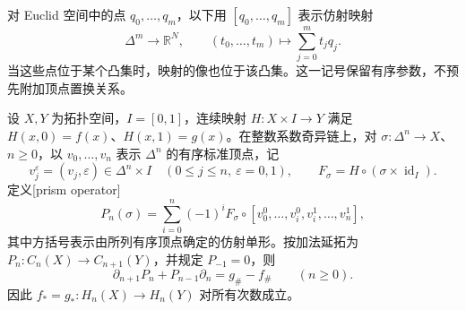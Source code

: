 对 Euclid 空间中的点 \(q_0,\ldots,q_m\)，以下用 \([q_0,\ldots,q_m]\) 表示仿射映射
\[
	\Delta^m\longrightarrow\mathbb R^N,\qquad
	(t_0,\ldots,t_m)\longmapsto\sum_{j=0}^m t_jq_j.
\]
当这些点位于某个凸集时，映射的像也位于该凸集。这一记号保留有序参数，不预先附加顶点置换关系。

\begin{theorem}\label{g2:thm:singular-homotopy-invariance}
	设 \(X,Y\) 为拓扑空间，\(I=[0,1]\)，连续映射 \(H:X\times I\to Y\) 满足 \(H(x,0)=f(x)\)、\(H(x,1)=g(x)\)。在整数系数奇异链上，对 \(\sigma:\Delta^n\to X\)、\(n\ge0\)，以 \(v_0,\ldots,v_n\) 表示 \(\Delta^n\) 的有序标准顶点，记
	\[
		v_j^\varepsilon=(v_j,\varepsilon)\in\Delta^n\times I
		\quad(0\le j\le n,\ \varepsilon=0,1),\qquad
		F_\sigma=H\circ(\sigma\times\operatorname{id}_I).
	\]
	定义[prism operator]
	\[
		P_n(\sigma)=\sum_{i=0}^n(-1)^i
		F_\sigma\circ
		[v_0^0,\ldots,v_i^0,v_i^1,\ldots,v_n^1],
	\]
	其中方括号表示由所列有序顶点确定的仿射单形。按加法延拓为 \(P_n:C_n(X)\to C_{n+1}(Y)\)，并规定 \(P_{-1}=0\)，则
	\begin{equation}\label{g2:eq:prism-identity}
		\partial_{n+1}P_n+P_{n-1}\partial_n=g_\#-f_\#
		\qquad(n\ge0).
	\end{equation}
	因此 \(f_*=g_*:H_n(X)\to H_n(Y)\) 对所有次数成立。
\end{theorem}
